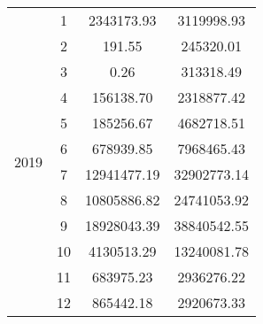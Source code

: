 \documentclass[12pt,letterpaper]{article}
\begin{document}
\begin{table}[H]
\begin{tabular}{l|c|c|c}
\cline{1-4}
\multirow[t]{12}{*}{2019} & 1 & 2343173.93 & 3119998.93 \\
 & 2 & 191.55 & 245320.01 \\
 & 3 & 0.26 & 313318.49 \\
 & 4 & 156138.70 & 2318877.42 \\
 & 5 & 185256.67 & 4682718.51 \\
 & 6 & 678939.85 & 7968465.43 \\
 & 7 & 12941477.19 & 32902773.14 \\
 & 8 & 10805886.82 & 24741053.92 \\
 & 9 & 18928043.39 & 38840542.55 \\
 & 10 & 4130513.29 & 13240081.78 \\
 & 11 & 683975.23 & 2936276.22 \\
 & 12 & 865442.18 & 2920673.33 \\
\cline{1-4}
\hline
\end{tabular}
\end{table}
\end{document}

